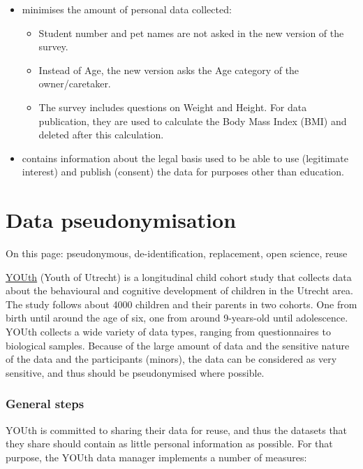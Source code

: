 \documentclass[
]{book}
\providecommand{\tightlist}{%
  \setlength{\itemsep}{0pt}\setlength{\parskip}{0pt}}
\begin{document}
\begin{itemize}
\tightlist
\item
  minimises the amount of personal data collected:

  \begin{itemize}
  \tightlist
  \item
    Student number and pet names are not asked in the new version of the survey.
  \item
    Instead of Age, the new version asks the Age category of the owner/caretaker.
  \item
    The survey includes questions on Weight and Height. For data publication,
    they are used to calculate the Body Mass Index (BMI) and deleted after this
    calculation.
  \end{itemize}
\item
  contains information about the legal basis used to be able to use (legitimate
  interest) and publish (consent) the data for purposes other than education.
\end{itemize}

\hypertarget{youth-pseudonymisation}{%
\chapter{Data pseudonymisation}\label{youth-pseudonymisation}}

On this page: pseudonymous, de-identification, replacement, open science, reuse

\href{https://www.uu.nl/en/research/youth-cohort-study}{YOUth}
(Youth of Utrecht) is a longitudinal child cohort study that collects data about
the behavioural and cognitive development of children in the Utrecht area. The
study follows about 4000 children and their parents in two cohorts. One from
birth until around the age of six, one from around 9-years-old until adolescence.
YOUth collects a wide variety of data types, ranging from questionnaires to
biological samples. Because of the large amount of data and the sensitive nature
of the data and the participants (minors), the data can be considered as very
sensitive, and thus should be pseudonymised where possible.

\hypertarget{general-steps}{%
\subsection{General steps}\label{general-steps}}

YOUth is committed to sharing their data for reuse, and thus the datasets that
they share should contain as little personal information as possible. For that
purpose, the YOUth data manager implements a number of measures:
\end{document}
